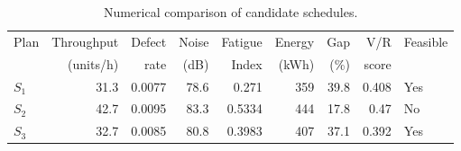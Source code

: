 \begin{table}[htbp]
\centering
\caption{Numerical comparison of candidate schedules.}
\label{tab:numerical-sim}
\small
\begin{tabular}{@{}lrrrrrrrl@{}}
\toprule
Plan & Throughput & Defect & Noise & Fatigue & Energy & Gap & V/R & Feasible \\
     & (units/h)  & rate   & (dB)  & Index   & (kWh)  & (\%) & score &         \\
\midrule
$S_{1}$ & 31.3 & 0.0077 & 78.6 & 0.271 & 359 & 39.8 & 0.408 & Yes \\
$S_{2}$ & 42.7 & 0.0095 & 83.3 & 0.5334 & 444 & 17.8 & 0.47 & No \\
$S_{3}$ & 32.7 & 0.0085 & 80.8 & 0.3983 & 407 & 37.1 & 0.392 & Yes \\
\bottomrule
\end{tabular}
\end{table}
